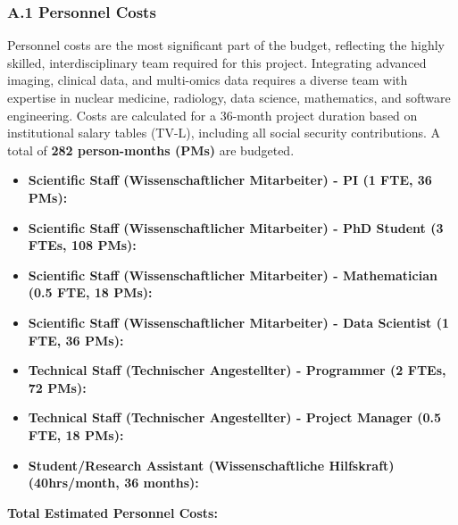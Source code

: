 \documentclass[11pt, a4paper]{article}
\begin{document}
\subsubsection*{A.1 Personnel Costs}
Personnel costs are the most significant part of the budget, reflecting the highly skilled, interdisciplinary team required for this project. Integrating advanced imaging, clinical data, and multi-omics data requires a diverse team with expertise in nuclear medicine, radiology, data science, mathematics, and software engineering. Costs are calculated for a 36-month project duration based on institutional salary tables (TV-L), including all social security contributions. A total of \textbf{282 person-months (PMs)} are budgeted.

\begin{itemize}
    \item \textbf{Scientific Staff (Wissenschaftlicher Mitarbeiter) - PI (1 FTE, 36 PMs):} 
    \item \textbf{Scientific Staff (Wissenschaftlicher Mitarbeiter) - PhD Student (3 FTEs, 108 PMs):} 
    \item \textbf{Scientific Staff (Wissenschaftlicher Mitarbeiter) - Mathematician (0.5 FTE, 18 PMs):} 
    \item \textbf{Scientific Staff (Wissenschaftlicher Mitarbeiter) - Data Scientist (1 FTE, 36 PMs):} 
    \item \textbf{Technical Staff (Technischer Angestellter) - Programmer (2 FTEs, 72 PMs):} 
    \item \textbf{Technical Staff (Technischer Angestellter) - Project Manager (0.5 FTE, 18 PMs):} 
    \item \textbf{Student/Research Assistant (Wissenschaftliche Hilfskraft) (40hrs/month, 36 months):} 
\end{itemize}

\textbf{Total Estimated Personnel Costs: }
\end{document}
